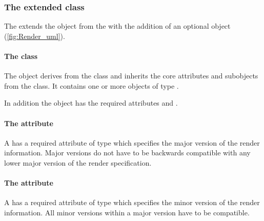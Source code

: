 \subsubsection{The extended  class}
\label{layout-class}

The \RenderPackage extends the  object from the \LayoutPackage with the addition
of an optional  \ListOfLocalRenderInformation object (\ref{fig:Render_uml}).

\paragraph{The  class}
\label{listoflocalrenderinformation-class}

The \ListOfLocalRenderInformation object derives from the  class
and inherits the core attributes and subobjects from the 
class. It contains one or more objects of type \LocalRenderInformation.

In addition the \ListOfLocalRenderInformation object has the required 
attributes  and .

\paragraph{The \fixttspace{} attribute}

A \ListOfLocalRenderInformation has a required attribute
 of type  which specifies the major version of the render information. Major versions do not have to be backwards compatible with any lower major version of the render specification.

\paragraph{The \fixttspace{} attribute}

A \ListOfLocalRenderInformation has a required attribute
 of type  which specifies the minor version of the render information.  All minor versions within a major version have to be compatible.


